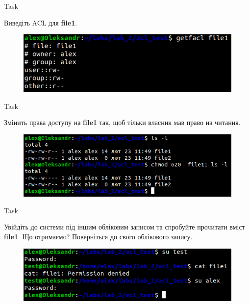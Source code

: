 \documentclass[a4paper,12pt]{article}
\newcommand{\RomanNumeralCaps}[1]{\MakeUppercase{\romannumeral #1}}
\begin{document}
    \begin{center}
        \Large{Task \RomanNumeralCaps{16}}
    \end{center}
    Виведіть ACL для \textbf{file1}.
    \begin{figure}[h!]
        \begin{minipage}[h]{1\linewidth}
            \centering
            \includegraphics[width=0.6\linewidth]{Prt sc/Figure_16.png}  
        \end{minipage}
    \end{figure}

    \begin{center}
        \Large{Task \RomanNumeralCaps{17}}
    \end{center}
    Змінить права доступу на \textbf{file1} так, щоб тільки власник мав право на читання.
    \begin{figure}[h!]
        \begin{minipage}[h]{1\linewidth}
            \centering
            \includegraphics[width=0.6\linewidth]{Prt sc/Figure_17.png}  
        \end{minipage}
    \end{figure}

\newpage
    \begin{center}
        \Large{Task \RomanNumeralCaps{18}}
    \end{center}
    Увійдіть до системи під іншим обліковим записом та спробуйте прочитати вміст \textbf{file1}. Що отримаємо? Поверніться до свого облікового запису.
    \begin{figure}[h!]
        \begin{minipage}[h]{1\linewidth}
            \centering
            \includegraphics[width=0.6\linewidth]{Prt sc/Figure_18.png}  
        \end{minipage}
    \end{figure}
\end{document}
